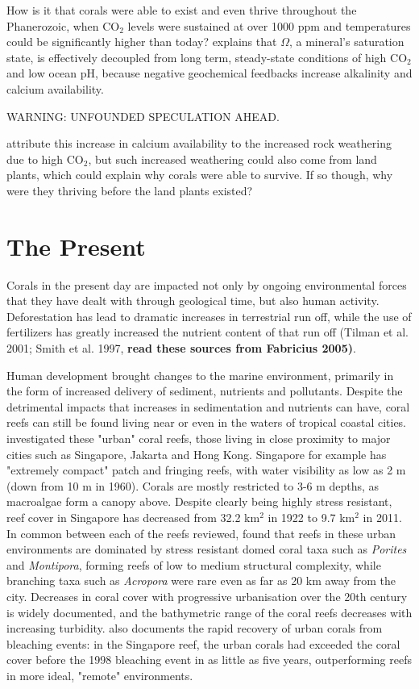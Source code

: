 \documentclass[11pt,a4paper]{article}
\begin{document}
How is it that corals were able to exist and even thrive throughout the Phanerozoic, when CO$_{2}$ levels were sustained at over 1000 ppm and temperatures could be significantly higher than today? \cite{Pandolfi2011} explains that $\Omega$, a mineral's saturation state, is effectively decoupled from long term, steady-state conditions of high CO$_{2}$ and low ocean pH, because negative geochemical feedbacks increase alkalinity and calcium availability.

WARNING: UNFOUNDED SPECULATION AHEAD.

 \cite{Pandolfi2011} attribute this increase in calcium availability to the increased rock weathering due to high CO$_{2}$, but such increased weathering could also come from land plants, which could explain why corals were able to survive. If so though, why were they thriving before the land plants existed?



\section{The Present}

Corals in the present day are impacted not only by ongoing environmental forces that they have dealt with through geological time, but also human activity. Deforestation has lead to dramatic increases in terrestrial run off, while the use of fertilizers has greatly increased the nutrient content of that run off (Tilman et al. 2001; Smith et al. 1997, \textbf{read these sources from Fabricius 2005)}. 

Human development brought changes to the marine environment, primarily in the form of increased delivery of sediment, nutrients and pollutants. Despite the detrimental impacts that increases in sedimentation and nutrients can have, coral reefs can still be found living near or even in the waters of tropical coastal cities. \cite{Heery2018} investigated these "urban" coral reefs, those living in close proximity to major cities such as Singapore, Jakarta and Hong Kong. Singapore for example has "extremely compact" patch and fringing reefs, with water visibility as low as 2 m (down from 10 m in 1960). Corals are mostly restricted to 3-6 m depths, as macroalgae form a canopy above. Despite clearly being highly stress resistant, reef cover in Singapore has decreased from 32.2 km$^{2}$ in 1922 to 9.7 km$^{2}$ in 2011. In common between each of the reefs reviewed, \cite{Heery2018} found that reefs in these urban environments are dominated by stress resistant domed coral taxa such as \textit{Porites} and \textit{Montipora}, forming reefs of low to medium structural complexity, while branching taxa such as \textit{Acropora} were rare even as far as 20 km away from the city. Decreases in coral cover with progressive urbanisation over the 20th century is widely documented, and the bathymetric range of the coral reefs decreases with increasing turbidity. \cite{Heery2018} also documents the rapid recovery of urban corals from bleaching events: in the Singapore reef, the urban corals had exceeded the coral cover before the 1998 bleaching event in as little as five years, outperforming reefs in more ideal, "remote" environments. %
\end{document}
